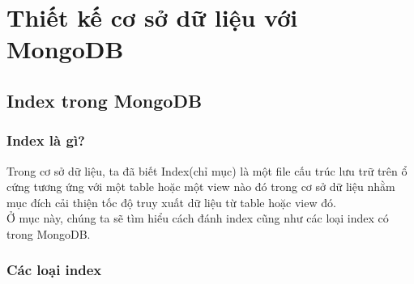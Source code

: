 \chapter{Thiết kế cơ sở dữ liệu với MongoDB}

\section{Index trong MongoDB}\cite{def}
\subsection{Index là gì?}
Trong cơ sở dữ liệu, ta đã biết Index(chỉ mục) là một file cấu trúc lưu trữ trên ổ cứng tương ứng với một table hoặc một view nào đó trong cơ sở dữ liệu nhằm mục đích cải thiện tốc độ truy xuất dữ liệu từ table hoặc view đó.\\
Ở mục này, chúng ta sẽ tìm hiểu cách đánh index cũng như các loại index có trong MongoDB.
\subsection{Các loại index}

